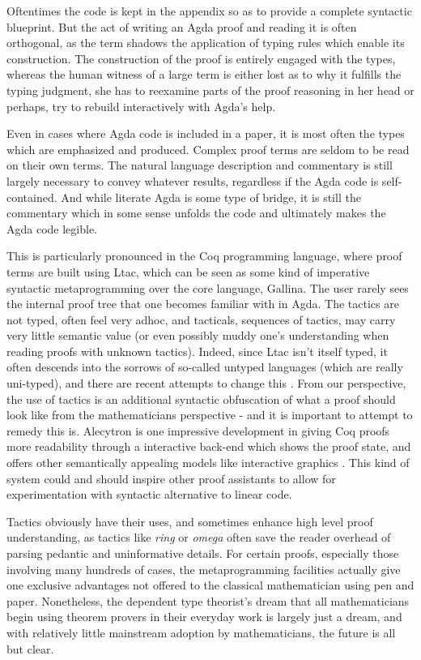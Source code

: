 Oftentimes the code is kept in the appendix so as to provide a complete
syntactic blueprint. But the act of writing an Agda proof and reading it is
often orthogonal, as the term shadows the application of typing rules
which enable its construction. The construction of the proof is
entirely engaged with the types, whereas the human witness of a large term is
either lost as to why it fulfills the typing judgment, she has to reexamine
parts of the proof reasoning in her head or perhaps, try to rebuild 
interactively with Agda's help.

Even in cases where Agda code is included in a paper, it is most often the types
which are emphasized and produced. Complex proof terms are seldom to be read on
their own terms. The natural language description and commentary is still
largely necessary to convey whatever results, regardless if the Agda code is
self-contained. And while literate Agda is some type of bridge, it is still the
commentary which in some sense unfolds the code and ultimately makes the Agda
code legible.

This is particularly pronounced in the Coq programming language, where proof
terms are built using Ltac, which can be seen as some kind of imperative
syntactic metaprogramming over the core language, Gallina. The user rarely sees
the internal proof tree that one becomes familiar with in Agda. The tactics are
not typed, often feel very adhoc, and tacticals, sequences of tactics, may carry
very little semantic value (or even possibly muddy one's understanding when
reading proofs with unknown tactics). Indeed, since Ltac isn't itself typed, it
often descends into the sorrows of so-called untyped languages (which are really
uni-typed), and there are recent attempts to change this \cite{mtac2}
\cite{ltac2}. From our perspective, the use of tactics is an additional
syntactic obfuscation of what a proof should look like from the mathematicians
perspective - and it is important to attempt to remedy this is. Alecytron is one
impressive development in giving Coq proofs more readability through a
interactive back-end which shows the proof state, and offers other semantically
appealing models like interactive graphics \cite{coqAlec}. This kind of system
could and should inspire other proof assistants to allow for experimentation
with syntactic alternative to linear code.

Tactics obviously have their uses, and sometimes enhance high level proof
understanding, as tactics like \emph{ring} or \emph{omega} often save the reader overhead
of parsing pedantic and uninformative details. For certain proofs,
especially those involving many hundreds of cases, the metaprogramming
facilities actually give one exclusive advantages not offered to the classical
mathematician using pen and paper. Nonetheless, the dependent type theorist's
dream that all mathematicians begin using theorem provers in their everyday work
is largely just a dream, and with relatively little mainstream adoption by
mathematicians, the future is all but clear.

